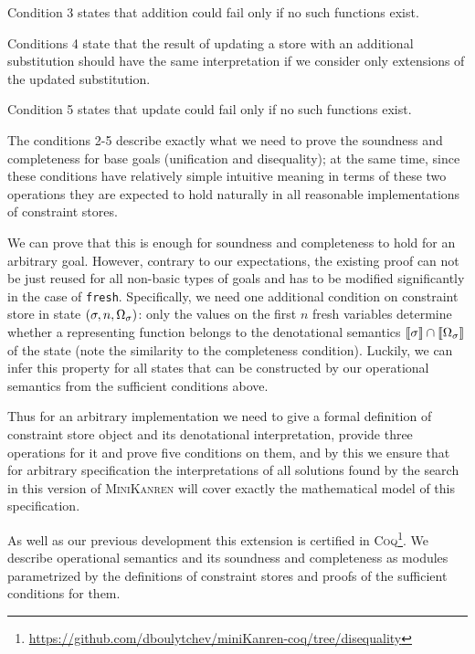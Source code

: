 Condition 3 states that addition could fail only if no such functions exist.

Conditions 4 state that the result of updating a store with an additional substitution should have the same interpretation if we consider only extensions of the updated substitution.

Condition 5 states that update could fail only if no such functions exist.

The conditions 2-5 describe exactly what we need to prove the soundness and completeness for base goals (unification and disequality); at the same time,
since these conditions have relatively simple intuitive meaning in terms of these two operations they are expected to hold naturally
in all reasonable implementations of constraint stores.

We can prove that this is enough for soundness and completeness to hold for an arbitrary goal. However,
contrary to our expectations, the existing proof can not be just reused for all non-basic types of goals and has to be modified
significantly in the case of \lstinline|fresh|. Specifically, we need one additional condition on constraint store in state $(\sigma, n, \Omega_\sigma)$:
only the values on the first $n$ fresh variables determine whether a representing function belongs to the denotational semantics $\llbracket{\sigma}\rrbracket \cap \llbracket{\Omega_\sigma}\rrbracket$
of the state (note the similarity to the completeness condition). Luckily, we can infer this property for all states that can be constructed by our operational
semantics from the sufficient conditions above.

Thus for an arbitrary implementation we need to give a formal definition of constraint store object and its denotational interpretation, provide three
operations for it and prove five conditions on them, and by this we ensure that for arbitrary specification the interpretations of all solutions found by the
search in this version of \textsc{MiniKanren} will cover exactly the mathematical model of this specification.

As well as our previous development this extension is certified in \textsc{Coq}\footnote{\url{https://github.com/dboulytchev/miniKanren-coq/tree/disequality}}.
We describe operational semantics and its soundness and completeness as modules parametrized by the definitions of constraint
stores and proofs of the sufficient conditions for them.

